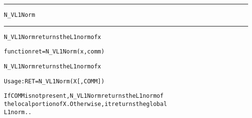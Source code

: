 \begin{samepage}
\hrule
\begin{center}
{\large \verb!N_VL1Norm!}
\label{p:N_VL1Norm}
\end{center}
\hrule\vspace{0.1in}



\begin{alltt}
N_VL1Norm returns the L1 norm of x
\end{alltt}

\end{samepage}



\begin{samepage}


\begin{alltt}
function ret = N_VL1Norm(x,comm) 
\end{alltt}

\end{samepage}



\begin{alltt}
N_VL1Norm returns the L1 norm of x

   Usage:  RET = N_VL1Norm ( X [, COMM] )

If COMM is not present, N_VL1Norm returns the L1 norm of 
the local portion of X. Otherwise, it returns the global
L1 norm..
\end{alltt}





 



\vspace{0.1in}